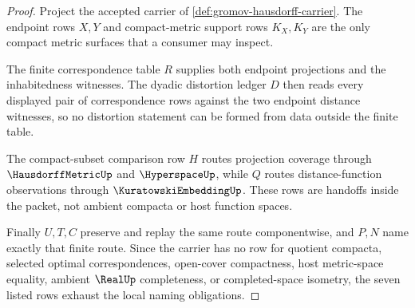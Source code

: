 \begin{proof}
Project the accepted carrier of \autoref{def:gromov-hausdorff-carrier}. The endpoint rows $X,Y$ and compact-metric support rows $K_X,K_Y$ are the only compact metric surfaces that a consumer may inspect.

The finite correspondence table $R$ supplies both endpoint projections and the inhabitedness witnesses. The dyadic distortion ledger $D$ then reads every displayed pair of correspondence rows against the two endpoint distance witnesses, so no distortion statement can be formed from data outside the finite table.

The compact-subset comparison row $H$ routes projection coverage through $\HausdorffMetricUp$ and $\HyperspaceUp$, while $Q$ routes distance-function observations through $\KuratowskiEmbeddingUp$. These rows are handoffs inside the packet, not ambient compacta or host function spaces.

Finally $U,T,C$ preserve and replay the same route componentwise, and $P,N$ name exactly that finite route. Since the carrier has no row for quotient compacta, selected optimal correspondences, open-cover compactness, host metric-space equality, ambient $\RealUp$ completeness, or completed-space isometry, the seven listed rows exhaust the local naming obligations.
\end{proof}


